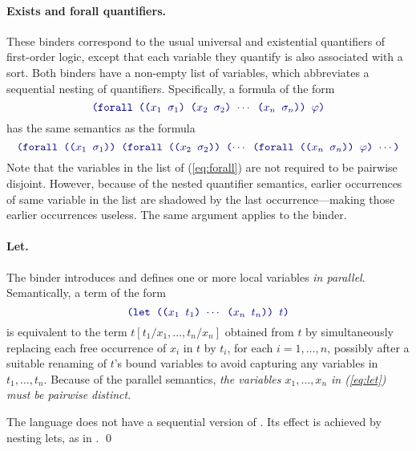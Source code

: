 \paragraph{Exists and forall quantifiers.}
These binders correspond 
to the usual universal and existential quantifiers of first-order logic,
except that each variable they quantify is also associated with a sort.
Both binders have a non-empty list of variables, 
which abbreviates a sequential nesting of quantifiers.
Specifically, a formula of the form
%
\begin{equation} \label{eq:forall}
\expr{
(forall (($x_1$ $\sigma_1$) ($x_2$ $\sigma_2$) $\cdots$ ($x_n$ $\sigma_n$)) 
  $\varphi$)
}
\end{equation}
%
has the same semantics as the formula
%
\begin{equation} \label{eq:nested-forall}
\expr{
 (forall (($x_1$ $\sigma_1$)) 
 (forall (($x_2$ $\sigma_2$)) ($\cdots$ 
 (forall (($x_n$ $\sigma_n$)) $\varphi$) $\cdots$)
}
\end{equation}
%
Note that the variables in the list 
of (\ref{eq:forall}) are not required to be pairwise disjoint.
However, because of the nested quantifier semantics, earlier occurrences 
of same variable in the list are shadowed by the last occurrence---making 
those earlier occurrences useless.
The same argument applies to the  binder.

\paragraph{Let.}
The  binder introduces and defines 
one or more local variables \emph{in parallel}.
Semantically, a term of the form
%
\begin{equation} \label{eq:let}
\expr{(let (($x_1$ $t_1$) $\cdots$ ($x_n$ $t_n$)) $t$)}
\end{equation}
%
is equivalent to the term $t[t_1/x_1, \ldots, t_n/x_n]$ obtained from $t$ 
by simultaneously replacing each free occurrence of $x_i$ in $t$ by $t_i$, 
for each $i=1,\ldots,n$,
possibly after a suitable renaming of $t$'s bound variables 
to avoid capturing any variables in $t_1, \ldots, t_n$.
Because of the parallel semantics, 
\emph{the variables $x_1, \ldots, x_n$ in (\ref{eq:let}) must be pairwise distinct}.

\begin{remark}
The language does not have a sequential version of .
Its effect is achieved by nesting lets, as in 
.
\qed
\end{remark}

